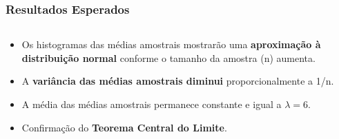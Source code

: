 \documentclass[aspectratio=169,12pt]{beamer}
\begin{document}
\begin{frame}
    \frametitle{Resultados Esperados}
    
    \begin{columns}
        \begin{column}{0.55\textwidth}
            \begin{itemize}
                \item[\faIcon{chart-bar}] Os histogramas das médias amostrais mostrarão uma \textcolor{azulprincipal}{\textbf{aproximação à distribuição normal}} conforme o tamanho da amostra (n) aumenta.
                \vspace{0.3cm}
                
                \item[\faIcon{compress-arrows-alt}] A \textcolor{azulprincipal}{\textbf{variância das médias amostrais diminui}} proporcionalmente a 1/n.
                \vspace{0.3cm}
                
                \item[\faIcon{equals}] A média das médias amostrais permanece constante e igual a $\lambda = 6$.
                \vspace{0.3cm}
                
                \item[\faIcon{check-double}] Confirmação do \textcolor{azulprincipal}{\textbf{Teorema Central do Limite}}.
            \end{itemize}
        \end{column}
        
        \begin{column}{0.45\textwidth}
            \begin{center}
\end{center}
\end{column}
\end{columns}
\end{frame}
\end{document}
